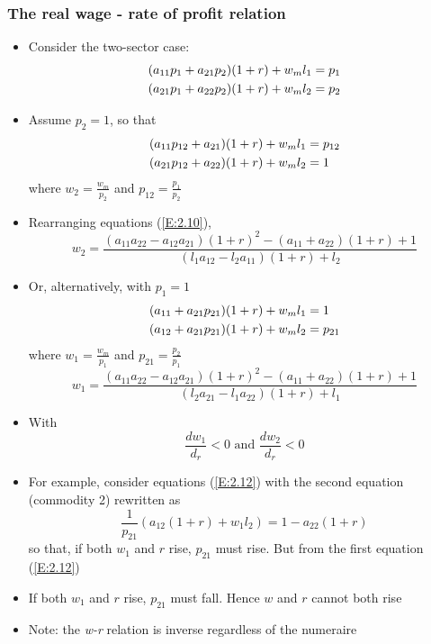 \documentclass{article}
\begin{document}
\subsubsection{The real wage - rate of profit relation}
	\begin{itemize}
		\item Consider the two-sector case:
		\begin{gather}
			(a_{11} p_1 + a_{21} p_2) (1 + r) + w_m l_1 = p_1 \notag \\
			(a_{21} p_1 + a_{22} p_2) (1 + r) + w_m l_2 = p_2 \label{E:2.9}
		\end{gather}
		\item  Assume \( p_2 = 1 \), so that
		\begin{align}
			(a_{11} p_{12} + a_{21}) (1 + r) + w_m l_1 &= p_{12} \notag \\
			(a_{21} p_{12} + a_{22}) (1 + r) + w_m l_2 &= 1 \label{E:2.10}
		\end{align}
		where \( w_2 = \frac{w_m}{p_2} \) and \( p_{12} = \frac{p_1}{p_2} \)
		\item Rearranging equations (\ref{E:2.10}),
		\begin{equation}
			w_2 = \frac{(a_{11} a_{22} - a_{12} a_{21}) (1 + r)^2 - (a_{11} + a_{22}) (1 + r) + 1}{(l_1 a_{12} - l_2 a_{11}) (1 + r) + l_2} \label{E:2.11}
		\end{equation}
		\item Or, alternatively, with \( p_1 = 1 \)
		\begin{align}
			(a_{11} + a_{21} p_{21}) (1 + r) + w_m l_1 &= 1 \notag \\
			(a_{12} + a_{21} p_{21}) (1 + r) + w_m l_2 &= p_{21} \label{E:2.12}
		\end{align}
		where \( w_1 = \frac{w_m}{p_1} \) and \( p_{21} = \frac{p_2}{p_1} \)
		\begin{equation}
			w_1 = \frac{(a_{11} a_{22} - a_{12} a_{21}) (1 + r)^2 - (a_{11} + a_{22}) (1 + r) + 1}{(l_2 a_{21} - l_1 a_{22}) (1 + r) + l_1} \label{E:2.13}
		\end{equation}
		\item With
		\[
			\frac{dw_1}{d_r} < 0 \text{ and } \frac{dw_2}{d_r} < 0
		\]
		\item  For example, consider equations (\ref{E:2.12}) with the second equation (commodity 2) rewritten as
		\[
			\frac{1}{p_{21}} (a_{12} (1 + r) + w_1 l_2) = 1 - a_{22} (1 + r)
		\]
		so that, if both \( w_1 \) and \( r \) rise, \( p_{21} \) must rise. But from the first equation (\ref{E:2.12})
		\item If both \( w_1 \) and \( r \) rise, \( p_{21} \) must fall. Hence \( w \) and \( r \) cannot both rise
		\item Note: the \textit{w-r} relation is inverse regardless of the numeraire
	\end{itemize}
\end{document}
